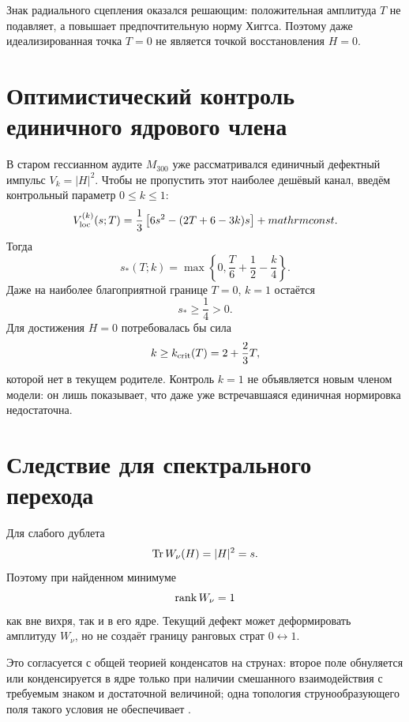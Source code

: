 Знак радиального сцепления оказался решающим: положительная амплитуда
$T$ не подавляет, а повышает предпочтительную норму Хиггса. Поэтому даже
идеализированная точка $T=0$ не является точкой восстановления $H=0$.

\section{Оптимистический контроль единичного ядрового члена}

В старом гессианном аудите $M_{300}$ уже рассматривался единичный
дефектный импульс $V_k=|H|^2$. Чтобы не пропустить этот наиболее дешёвый
канал, введём контрольный параметр $0\leq k\leq1$:
\begin{equation}
 V_{\rm loc}^{(k)}(s;T)
 =\frac13\left[6s^2-(2T+6-3k)s\right]+mathrm{const}.
\end{equation}
Тогда
\begin{equation}
 s_*(T;k)=\max\left\{0,
 \frac{T}{6}+\frac12-\frac{k}{4}\right\}.
 \label{eq:v6-rank-localization-optimistic-minimum}
\end{equation}
Даже на наиболее благоприятной границе $T=0$, $k=1$ остаётся
\begin{equation}
 s_*\geq\frac14>0.
\end{equation}
Для достижения $H=0$ потребовалась бы сила
\begin{equation}
 k\geq k_{\rm crit}(T)=2+\frac23T,
 \label{eq:v6-rank-localization-critical-strength}
\end{equation}
которой нет в текущем родителе. Контроль $k=1$ не объявляется новым
членом модели: он лишь показывает, что даже уже встречавшаяся
единичная нормировка недостаточна.

\section{Следствие для спектрального перехода}

Для слабого дублета
\begin{equation}
 \operatorname{Tr} W_\nu(H)=|H|^2=s.
\end{equation}
Поэтому при найденном минимуме
\begin{equation}
 \operatorname{rank} W_\nu=1
\end{equation}
как вне вихря, так и в его ядре. Текущий дефект может деформировать
амплитуду $W_\nu$, но не создаёт границу ранговых страт $0\leftrightarrow1$.

Это согласуется с общей теорией конденсатов на струнах: второе поле
обнуляется или конденсируется в ядре только при наличии смешанного
взаимодействия с требуемым знаком и достаточной величиной; одна топология
струнообразующего поля такого условия не обеспечивает
\cite{rank-localization-witten1985,rank-localization-achucarro2000,
rank-localization-forgacs2017}.

